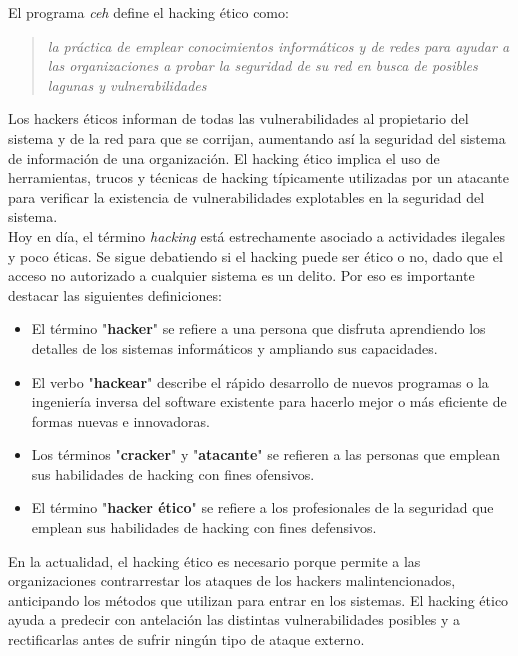 El programa \textit{\acrfull{ceh}} define el hacking ético como:

\begin{quote}
    \textit{la práctica de emplear conocimientos informáticos y de redes para ayudar a las organizaciones a probar la seguridad de su red en busca de posibles lagunas y vulnerabilidades}
\end{quote}

Los hackers éticos informan de todas las vulnerabilidades al propietario del sistema y de la red para que se corrijan, aumentando así la seguridad del sistema de información de una organización. El hacking ético implica el uso de herramientas, trucos y técnicas de hacking típicamente utilizadas por un atacante para verificar la existencia de vulnerabilidades explotables en la seguridad del sistema.\\

Hoy en día, el término \textit{hacking} está estrechamente asociado a actividades ilegales y poco éticas. Se sigue debatiendo si el hacking puede ser ético o no, dado que el acceso no autorizado a cualquier sistema es un delito. Por eso es importante destacar las siguientes definiciones:

\begin{itemize}
    \item El término "\textbf{hacker}" se refiere a una persona que disfruta aprendiendo los detalles de los sistemas informáticos y ampliando sus capacidades.
    \item El verbo "\textbf{hackear}" describe el rápido desarrollo de nuevos programas o la ingeniería inversa del software existente para hacerlo mejor o más eficiente de formas nuevas e innovadoras.
    \item Los términos "\textbf{cracker}" y "\textbf{atacante}" se refieren a las personas que emplean sus habilidades de hacking con fines ofensivos.
    \item El término "\textbf{hacker ético}" se refiere a los profesionales de la seguridad que emplean sus habilidades de hacking con fines defensivos.
\end{itemize}

En la actualidad, el hacking ético es necesario porque permite a las organizaciones contrarrestar los ataques de los hackers malintencionados, anticipando los métodos que utilizan para entrar en los sistemas. El hacking ético ayuda a predecir con antelación las distintas vulnerabilidades posibles y a rectificarlas antes de sufrir ningún tipo de ataque externo.


